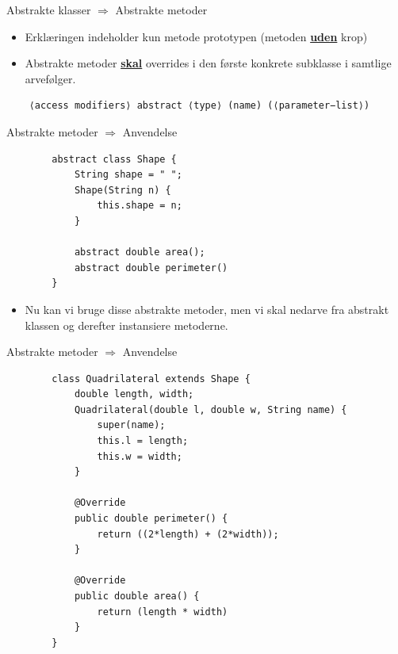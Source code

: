 \documentclass[10pt,aspectratio=1610]{beamer}
\begin{document}
\begin{frame}[fragile]{Abstrakte klasser $\Rightarrow$ Abstrakte metoder}
\begin{itemize}
    \item Erklæringen indeholder kun metode prototypen (metoden \alert{\textbf{\underline{uden}}} krop) 
    \item Abstrakte metoder \alert{\textbf{\underline{skal}}} overrides i den første konkrete subklasse i samtlige arvefølger.
\end{itemize}
\begin{verbatim}
    ⟨access modifiers⟩ abstract ⟨type⟩ (name) (⟨parameter−list⟩)
\end{verbatim}
    
\end{frame}
\begin{frame}[fragile]{Abstrakte metoder $\Rightarrow$ Anvendelse}
    \begin{lstlisting}
        abstract class Shape {
            String shape = " ";
            Shape(String n) {
                this.shape = n;
            }

            abstract double area();
            abstract double perimeter()
        }
    \end{lstlisting}
    \begin{itemize}
        \item Nu kan vi bruge disse abstrakte metoder, men vi skal nedarve fra abstrakt klassen og derefter instansiere metoderne.
    \end{itemize}
\end{frame}

\begin{frame}[fragile]{Abstrakte metoder $\Rightarrow$ Anvendelse}
     \begin{lstlisting}
        class Quadrilateral extends Shape {
            double length, width;
            Quadrilateral(double l, double w, String name) {
                super(name);
                this.l = length;
                this.w = width;
            }

            @Override
            public double perimeter() {
                return ((2*length) + (2*width));
            }

            @Override
            public double area() {
                return (length * width) 
            }
        } 
    \end{lstlisting}
\end{frame}
\end{document}
